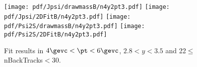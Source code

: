 \begin{figure}[H]
\begin{center}
\texttt{[image: pdf/Jpsi/drawmassB/n4y2pt3.pdf]}
\texttt{[image: pdf/Jpsi/2DFitB/n4y2pt3.pdf]}
\vspace*{-0.5cm}
\texttt{[image: pdf/Psi2S/drawmassB/n4y2pt3.pdf]}
\texttt{[image: pdf/Psi2S/2DFitB/n4y2pt3.pdf]}
\vspace*{-0.5cm}
\end{center}
\caption{Fit results in $4\gevc<\pt<6\gevc$, $2.8<y<3.5$ and 22$\leq$nBackTracks$<$30.}
\label{Fitn4y2pt3}
\end{figure}
